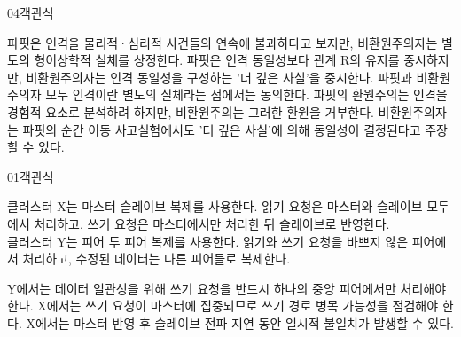 \documentclass[fs85,seriesWit]{korfarm-base}
\begin{document}
\begin{kfQBlock}{04}{객관식}
\begin{kfChoices}
\kfChoice 파핏은 인격을 물리적·심리적 사건들의 연속에 불과하다고 보지만, 비환원주의자는 별도의 형이상학적 실체를 상정한다.
\kfChoice 파핏은 인격 동일성보다 관계 R의 유지를 중시하지만, 비환원주의자는 인격 동일성을 구성하는 '더 깊은 사실'을 중시한다.
\kfChoice 파핏과 비환원주의자 모두 인격이란 별도의 실체라는 점에서는 동의한다.
\kfChoice 파핏의 환원주의는 인격을 경험적 요소로 분석하려 하지만, 비환원주의는 그러한 환원을 거부한다.
\kfChoice 비환원주의자는 파핏의 순간 이동 사고실험에서도 '더 깊은 사실'에 의해 동일성이 결정된다고 주장할 수 있다.
\end{kfChoices}
\end{kfQBlock}

\kfEndMC



\begin{kfQBlock}{01}{객관식}
\begin{kfEvidence}클러스터 X는 마스터-슬레이브 복제를 사용한다. 읽기 요청은 마스터와 슬레이브 모두에서 처리하고, 쓰기 요청은 마스터에서만 처리한 뒤 슬레이브로 반영한다. \\\relax
클러스터 Y는 피어 투 피어 복제를 사용한다. 읽기와 쓰기 요청을 바쁘지 않은 피어에서 처리하고, 수정된 데이터는 다른 피어들로 복제한다.\end{kfEvidence}
\begin{kfChoices}
\kfChoice Y에서는 데이터 일관성을 위해 쓰기 요청을 반드시 하나의 중앙 피어에서만 처리해야 한다.
\kfChoice X에서는 쓰기 요청이 마스터에 집중되므로 쓰기 경로 병목 가능성을 점검해야 한다.
\kfChoice X에서는 마스터 반영 후 슬레이브 전파 지연 동안 일시적 불일치가 발생할 수 있다.
\end{kfChoices}
\end{kfQBlock}
\end{document}
